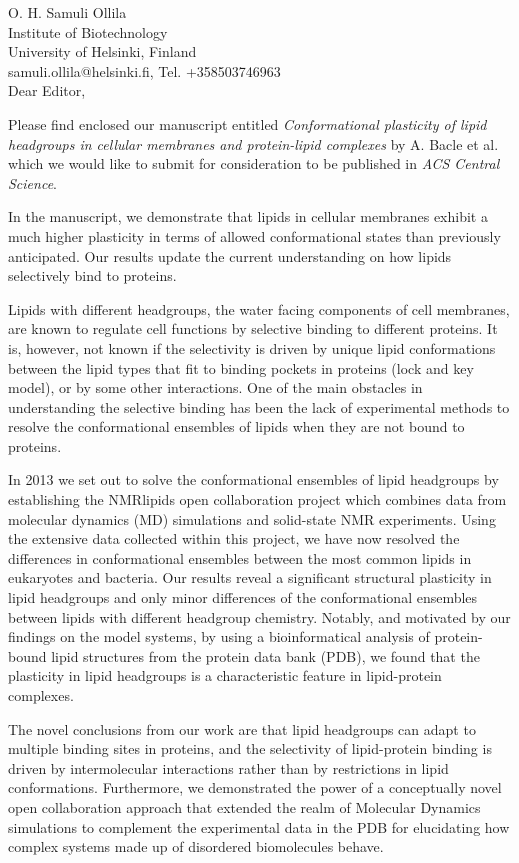\documentclass[11pt]{letter}
\begin{document}
\reversemarginpar
\pagestyle{empty}
\noindent O. H. Samuli Ollila \\
\noindent Institute of Biotechnology \\
\noindent University of Helsinki, Finland \\
\noindent samuli.ollila@helsinki.fi, Tel. +358503746963 \\


Dear Editor,

Please find enclosed our manuscript entitled {\it Conformational plasticity of lipid headgroups in cellular membranes and protein-lipid complexes}
by A. Bacle et al. which we would like to submit for consideration to be published in \textit{ACS Central Science}.

In the manuscript, we demonstrate that lipids in cellular membranes exhibit a much higher plasticity in terms of allowed conformational states than previously anticipated.
Our results update the current understanding on how lipids selectively bind to proteins.

Lipids with different headgroups, the water facing components of cell membranes, are known to regulate cell functions
by selective binding to different proteins. It is, however, not known if the selectivity is driven by unique
lipid conformations between the lipid types that fit to binding pockets in proteins (lock and key model), or by some other interactions.
One of the main obstacles in understanding the selective binding has been the lack of
experimental methods to resolve the conformational ensembles of lipids when they are not bound to proteins.

In 2013 we set out to solve the conformational ensembles of lipid headgroups by establishing the NMRlipids open collaboration project
which combines data from molecular dynamics (MD) simulations and solid-state NMR experiments.
Using the extensive data collected within this project, we have now resolved the differences in conformational ensembles
between the most common lipids in eukaryotes and bacteria. 
Our results reveal a significant structural plasticity in lipid headgroups and only minor differences of the conformational ensembles
between lipids with different headgroup chemistry.
Notably, and motivated by our findings on the model systems, by using a bioinformatical analysis of protein-bound lipid structures from the protein data bank (PDB), we found that the plasticity in lipid headgroups is a characteristic feature in lipid-protein complexes.

The novel conclusions from our work are that lipid headgroups can adapt to multiple binding sites in proteins,
and the selectivity of lipid-protein binding is driven by intermolecular interactions rather than by restrictions in lipid conformations.
Furthermore, we demonstrated the power of a conceptually novel open collaboration approach that extended the realm of Molecular Dynamics simulations to complement the experimental data in the PDB for elucidating how complex systems made up of disordered biomolecules behave.
\end{document}
